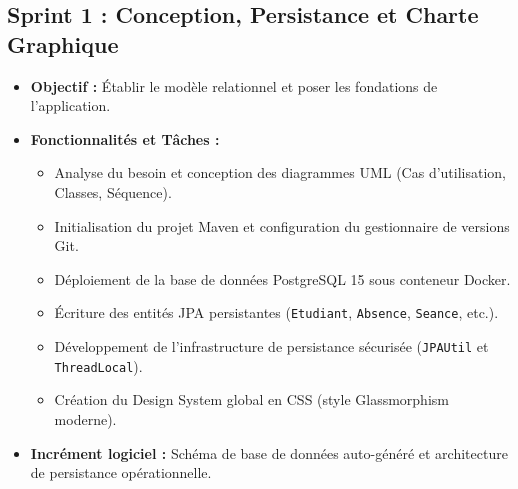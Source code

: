 \documentclass[12pt,a4paper]{article}
\begin{document}
\subsection{Sprint 1 : Conception, Persistance et Charte Graphique}
\begin{itemize}
    \item \textbf{Objectif :} Établir le modèle relationnel et poser les fondations de l'application.
    \item \textbf{Fonctionnalités et Tâches :}
    \begin{itemize}
        \item Analyse du besoin et conception des diagrammes UML (Cas d'utilisation, Classes, Séquence).
        \item Initialisation du projet Maven et configuration du gestionnaire de versions Git.
        \item Déploiement de la base de données PostgreSQL 15 sous conteneur Docker.
        \item Écriture des entités JPA persistantes (\texttt{Etudiant}, \texttt{Absence}, \texttt{Seance}, etc.).
        \item Développement de l'infrastructure de persistance sécurisée (\texttt{JPAUtil} et \texttt{ThreadLocal}).
        \item Création du Design System global en CSS (style Glassmorphism moderne).
    \end{itemize}
    \item \textbf{Incrément logiciel :} Schéma de base de données auto-généré et architecture de persistance opérationnelle.
\end{itemize}
\end{document}
